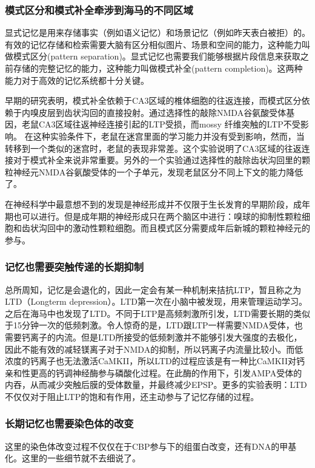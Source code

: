 \documentclass[UTF8,nofonts]{ctexart}
\begin{document}
\subsubsection{模式区分和模式补全牵涉到海马的不同区域}
显式记忆是用来存储事实（例如语义记忆）和场景记忆（例如昨天表白被拒）的。有效的记忆存储和检索需要大脑有区分相似图片、场景和空间的能力，这种能力叫做模式区分(pattern separation)。显式记忆也需要我们能够根据片段信息来获取之前存储的完整记忆的能力，这种能力叫做模式补全(pattern completion)。这两种能力对于高效的记忆系统都十分关键。
\par
早期的研究表明，模式补全依赖于CA3区域的椎体细胞的往返连接，而模式区分依赖于内嗅皮层到齿状沟回的直接投射。通过选择性的敲除NMDA谷氨酸受体基因，老鼠CA3区域往返神经连接引起的LTP受损，而mossy 纤维突触的LTP不受影响。
在这种实验条件下，老鼠在迷宫里面的学习能力并没有受到影响，然而，当转移到一个类似的迷宫时，老鼠的表现非常差。这个实验说明了CA3区域的往返连接对于模式补全来说非常重要。另外的一个实验通过选择性的敲除齿状沟回里的颗粒神经元NMDA谷氨酸受体的一个子单元，发现老鼠区分不同上下文的能力降低了。
\par
在神经科学中最意想不到的发现是神经形成并不仅限于生长发育的早期阶段，成年期也可以进行。但是成年期的神经形成只在两个脑区中进行：嗅球的抑制性颗粒细胞和齿状沟回中的激动性颗粒细胞。而且模式区分需要成年后新城的颗粒神经元的参与。
\subsubsection{记忆也需要突触传递的长期抑制}
总所周知，记忆是会退化的，因此一定会有某一种机制来拮抗LTP，暂且称之为LTD（Longterm depression）。LTD第一次在小脑中被发现，用来管理运动学习。之后在海马中也发现了LTD。不同于LTP是高频刺激所引发，LTD需要长期的类似于15分钟一次的低频刺激。令人惊奇的是，LTD跟LTP一样需要NMDA受体，也需要钙离子的内流。但是LTD所接受的低频刺激并不能够引发大强度的去极化，因此不能有效的减轻镁离子对于NMDA的抑制，所以钙离子内流量比较小。而低浓度的钙离子也无法激活CaMKII，所以LTD的过程应该是有一种比CaMKII对钙亲和性更高的钙调神经酶参与磷酸化过程。在此酶的作用下，引发AMPA受体的内吞，从而减少突触后膜的受体数量，并最终减少EPSP。更多的实验表明：LTD不仅仅对于阻止LTP的饱和有作用，还主动参与了记忆存储的过程。
\subsubsection{长期记忆也需要染色体的改变}
这里的染色体改变过程不仅仅在于CBP参与下的组蛋白改变，还有DNA的甲基化。这里的一些细节就不去细说了。

\par
\end{document}
